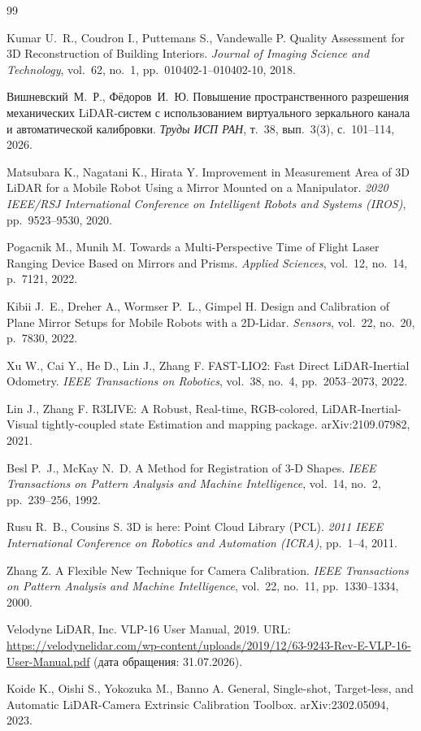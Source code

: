 \documentclass{misisarticle}
\begin{document}
\begin{thebibliography}{99}

 Kumar U.~R., Coudron I., Puttemans S., Vandewalle P. Quality Assessment for 3D Reconstruction of Building Interiors. \textit{Journal of Imaging Science and Technology}, vol.~62, no.~1, pp.~010402-1--010402-10, 2018.

 Вишневский~М.~Р., Фёдоров~И.~Ю. Повышение пространственного разрешения механических LiDAR-систем с использованием виртуального зеркального канала и автоматической калибровки. \textit{Труды ИСП РАН}, т.~38, вып.~3(3), с.~101--114, 2026.

 Matsubara K., Nagatani K., Hirata Y. Improvement in Measurement Area of 3D LiDAR for a Mobile Robot Using a Mirror Mounted on a Manipulator. \textit{2020 IEEE/RSJ International Conference on Intelligent Robots and Systems (IROS)}, pp.~9523--9530, 2020.

 Pogacnik M., Munih M. Towards a Multi-Perspective Time of Flight Laser Ranging Device Based on Mirrors and Prisms. \textit{Applied Sciences}, vol.~12, no.~14, p.~7121, 2022.

 Kibii J.~E., Dreher A., Wormser P.~L., Gimpel H. Design and Calibration of Plane Mirror Setups for Mobile Robots with a 2D-Lidar. \textit{Sensors}, vol.~22, no.~20, p.~7830, 2022.

 Xu W., Cai Y., He D., Lin J., Zhang F. FAST-LIO2: Fast Direct LiDAR-Inertial Odometry. \textit{IEEE Transactions on Robotics}, vol.~38, no.~4, pp.~2053--2073, 2022.

 Lin J., Zhang F. R3LIVE: A Robust, Real-time, RGB-colored, LiDAR-Inertial-Visual tightly-coupled state Estimation and mapping package. arXiv:2109.07982, 2021.

 Besl P.~J., McKay N.~D. A Method for Registration of 3-D Shapes. \textit{IEEE Transactions on Pattern Analysis and Machine Intelligence}, vol.~14, no.~2, pp.~239--256, 1992.

 Rusu R.~B., Cousins S. 3D is here: Point Cloud Library (PCL). \textit{2011 IEEE International Conference on Robotics and Automation (ICRA)}, pp.~1--4, 2011.

 Zhang Z. A Flexible New Technique for Camera Calibration. \textit{IEEE Transactions on Pattern Analysis and Machine Intelligence}, vol.~22, no.~11, pp.~1330--1334, 2000.

 Velodyne LiDAR, Inc. VLP-16 User Manual, 2019. URL: \url{https://velodynelidar.com/wp-content/uploads/2019/12/63-9243-Rev-E-VLP-16-User-Manual.pdf} (дата обращения: 31.07.2026).

 Koide K., Oishi S., Yokozuka M., Banno A. General, Single-shot, Target-less, and Automatic LiDAR-Camera Extrinsic Calibration Toolbox. arXiv:2302.05094, 2023.

\end{thebibliography}
\end{document}
